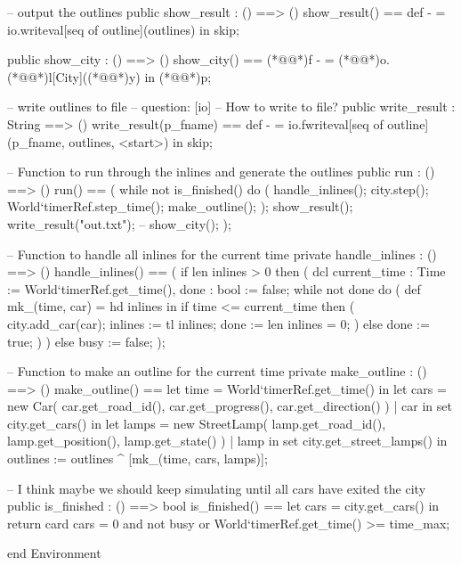 \documentclass[a4paper]{article}
\begin{document}
\begin{vdm_al}
    -- output the outlines
    public show_result : () ==> ()
    show_result() ==
        def - = io.writeval[seq of outline](outlines) in skip;
    
    public show_city : () ==> ()
    show_city() ==
        (*@@*)f - = (*@@*)o.(*@@*)l[City]((*@@*)y) in (*@@*)p;

    -- write outlines to file
    -- question: [io]
    --           How to write to file?
    public write_result : String ==> ()
    write_result(p_fname) ==
        def - = io.fwriteval[seq of outline](p_fname, outlines, <start>) in skip;
    
    -- Function to run through the inlines and generate the outlines
    public run : () ==> ()
    run() == (
        while not is_finished() do (
            handle_inlines();
            city.step();
            World`timerRef.step_time();
            make_outline();
        );
        show_result();
        write_result("out.txt");
        -- show_city();
    );

    -- Function to handle all inlines for the current time
    private handle_inlines : () ==> ()
    handle_inlines() == (
        if len inlines > 0 then (
            dcl current_time : Time := World`timerRef.get_time(),
                done : bool := false;
            while not done do (
                def mk_(time, car) = hd inlines in
                    if time <= current_time then (
                        city.add_car(car);
                        inlines := tl inlines;
                        done := len inlines = 0;
                    )
                    else done := true;
            )
        )
        else busy := false;
    );

    -- Function to make an outline for the current time
    private make_outline : () ==> ()
    make_outline() ==
        let time = World`timerRef.get_time() in
            let cars = {
                new Car(
                    car.get_road_id(),
                    car.get_progress(),
                    car.get_direction()
                ) | car in set city.get_cars()
            } in 
                let lamps = {
                    new StreetLamp(
                        lamp.get_road_id(),
                        lamp.get_position(),
                        lamp.get_state()
                    ) | lamp in set city.get_street_lamps()
                } in
                    outlines := outlines ^ [mk_(time, cars, lamps)];

    -- I think maybe we should keep simulating until all cars have exited the city
    public is_finished : () ==> bool 
    is_finished() == 
        let cars = city.get_cars() in
            return card cars = 0 and not busy or World`timerRef.get_time() >= time_max;

end Environment
\end{vdm_al}
\end{document}

